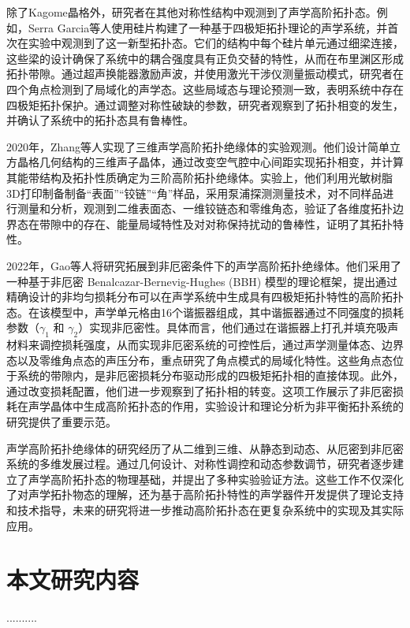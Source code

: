 除了Kagome晶格外，研究者在其他对称性结构中观测到了声学高阶拓扑态\cite{i6}。例如，Serra Garcia等人使用硅片构建了一种基于四极矩拓扑理论的声学系统，并首次在实验中观测到了这一新型拓扑态。它们的结构中每个硅片单元通过细梁连接，这些梁的设计确保了系统中的耦合强度具有正负交替的特性，从而在布里渊区形成拓扑带隙。通过超声换能器激励声波，并使用激光干涉仪测量振动模式，研究者在四个角点检测到了局域化的声学态。这些局域态与理论预测一致，表明系统中存在四极矩拓扑保护。通过调整对称性破缺的参数，研究者观察到了拓扑相变的发生，并确认了系统中的拓扑态具有鲁棒性。

2020年，Zhang等人实现了三维声学高阶拓扑绝缘体的实验观测\cite{i7}。他们设计简单立方晶格几何结构的三维声子晶体，通过改变空气腔中心间距实现拓扑相变，并计算其能带结构及拓扑性质确定为三阶高阶拓扑绝缘体。实验上，他们利用光敏树脂3D打印制备制备“表面”“铰链”“角”样品，采用泵浦探测测量技术，对不同样品进行测量和分析，观测到二维表面态、一维铰链态和零维角态，验证了各维度拓扑边界态在带隙中的存在、能量局域特性及对对称保持扰动的鲁棒性，证明了其拓扑特性。

2022年，Gao等人将研究拓展到非厄密条件下的声学高阶拓扑绝缘体\cite{i8}。他们采用了一种基于非厄密 Benalcazar-Bernevig-Hughes (BBH) 模型的理论框架，提出通过精确设计的非均匀损耗分布可以在声学系统中生成具有四极矩拓扑特性的高阶拓扑态。在该模型中，声学单元格由16个谐振器组成，其中谐振器通过不同强度的损耗参数（\(\gamma_1\) 和 \(\gamma_2\)）实现非厄密性。具体而言，他们通过在谐振器上打孔并填充吸声材料来调控损耗强度，从而实现非厄密系统的可控性后，通过声学测量体态、边界态以及零维角点态的声压分布，重点研究了角点模式的局域化特性。这些角点态位于系统的带隙内，是非厄密损耗分布驱动形成的四极矩拓扑相的直接体现。此外，通过改变损耗配置，他们进一步观察到了拓扑相的转变。这项工作展示了非厄密损耗在声学晶体中生成高阶拓扑态的作用，实验设计和理论分析为非平衡拓扑系统的研究提供了重要示范。

声学高阶拓扑绝缘体的研究经历了从二维到三维、从静态到动态、从厄密到非厄密系统的多维发展过程。通过几何设计、对称性调控和动态参数调节，研究者逐步建立了声学高阶拓扑态的物理基础，并提出了多种实验验证方法。这些工作不仅深化了对声学拓扑物态的理解，还为基于高阶拓扑特性的声学器件开发提供了理论支持和技术指导，未来的研究将进一步推动高阶拓扑态在更复杂系统中的实现及其实际应用。

\section{本文研究内容}

..........
